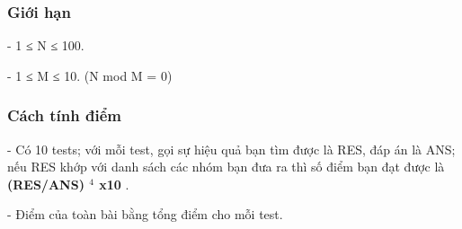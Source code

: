 \subsubsection{   Giới hạn  }

   - 1 ≤ N ≤ 100.   


   - 1 ≤ M ≤ 10. (N mod M = 0)  

\subsubsection{   Cách tính điểm  }

   - Có 10 tests; với mỗi test, gọi sự hiệu quả bạn tìm được là RES, đáp án là ANS; nếu RES khớp với danh sách các nhóm bạn đưa ra thì số điểm bạn đạt được là   \textbf{    (RES/ANS)    $^     4    $    x10   }   .   


   - Điểm của toàn bài bằng tổng điểm cho mỗi test.  

